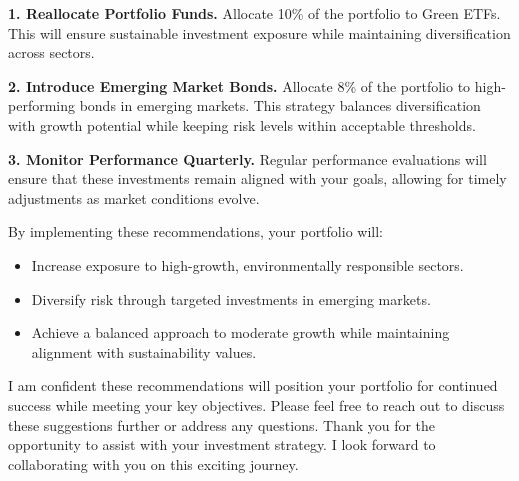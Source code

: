 \documentclass[11pt]{article}
\begin{document}
\begin{tcolorbox}[enhanced, colback=boxgray, frame hidden, arc=2mm,
    left=5mm, right=5mm, top=4mm, bottom=4mm, breakable]
\textbf{1. Reallocate Portfolio Funds.} Allocate 10\% of the portfolio to
Green ETFs. This will ensure sustainable investment exposure while maintaining
diversification across sectors.\par\smallskip
\textbf{2. Introduce Emerging Market Bonds.} Allocate 8\% of the portfolio to
high-performing bonds in emerging markets. This strategy balances
diversification with growth potential while keeping risk levels within
acceptable thresholds.\par\smallskip
\textbf{3. Monitor Performance Quarterly.} Regular performance evaluations
will ensure that these investments remain aligned with your goals, allowing
for timely adjustments as market conditions evolve.

By implementing these recommendations, your portfolio will:
\begin{itemize}[leftmargin=1.5em, itemsep=2pt]
  \item Increase exposure to high-growth, environmentally responsible sectors.
  \item Diversify risk through targeted investments in emerging markets.
  \item Achieve a balanced approach to moderate growth while maintaining
  alignment with sustainability values.
\end{itemize}

I am confident these recommendations will position your portfolio for
continued success while meeting your key objectives. Please feel free to reach
out to discuss these suggestions further or address any questions. Thank you
for the opportunity to assist with your investment strategy. I look forward to
collaborating with you on this exciting journey.
\end{tcolorbox}
\end{document}
